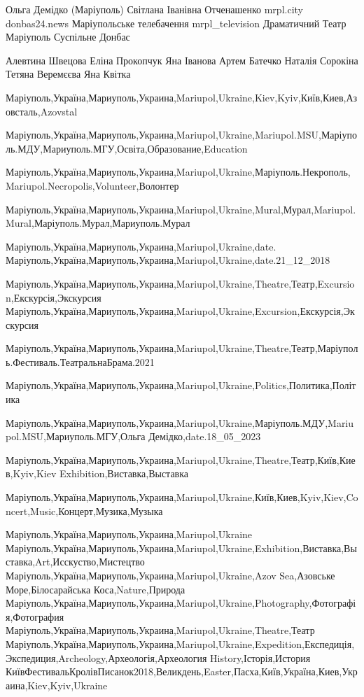  
 
 
 
 

Ольга Демідко (Маріуполь)
Світлана Іванівна Отченашенко
mrpl.city
donbas24.news
Маріупольське телебачення mrpl_television
Драматичний Театр Маріуполь
Суспільне Донбас

Алевтина Швецова
Еліна Прокопчук
Яна Іванова
Артем Батечко
Наталія Сорокіна
Тетяна Веремєєва
Яна Квітка

Маріуполь,Україна,Мариуполь,Украина,Mariupol,Ukraine,Kiev,Kyiv,Київ,Киев,Азовсталь,Azovstal

Маріуполь,Україна,Мариуполь,Украина,Mariupol,Ukraine,Mariupol.MSU,Маріуполь.МДУ,Мариуполь.МГУ,Освіта,Образование,Education

Маріуполь,Україна,Мариуполь,Украина,Mariupol,Ukraine,Маріуполь.Некрополь,Mariupol.Necropolis,Volunteer,Волонтер

Маріуполь,Україна,Мариуполь,Украина,Mariupol,Ukraine,Mural,Мурал,Mariupol.Mural,Маріуполь.Мурал,Мариуполь.Мурал

Маріуполь,Україна,Мариуполь,Украина,Mariupol,Ukraine,date.
Маріуполь,Україна,Мариуполь,Украина,Mariupol,Ukraine,date.21_12_2018

Маріуполь,Україна,Мариуполь,Украина,Mariupol,Ukraine,Theatre,Театр,Excursion,Екскурсія,Экскурсия
Маріуполь,Україна,Мариуполь,Украина,Mariupol,Ukraine,Excursion,Екскурсія,Экскурсия

Маріуполь,Україна,Мариуполь,Украина,Mariupol,Ukraine,Theatre,Театр,Маріуполь.Фестиваль.ТеатральнаБрама.2021

Маріуполь,Україна,Мариуполь,Украина,Mariupol,Ukraine,Politics,Политика,Політика

Маріуполь,Україна,Мариуполь,Украина,Mariupol,Ukraine,Маріуполь.МДУ,Mariupol.MSU,Мариуполь.МГУ,Ольга Демідко,date.18_05_2023

Маріуполь,Україна,Мариуполь,Украина,Mariupol,Ukraine,Theatre,Театр,Київ,Киев,Kyiv,Kiev
Exhibition,Виставка,Выставка

Маріуполь,Україна,Мариуполь,Украина,Mariupol,Ukraine,Київ,Киев,Kyiv,Kiev,Concert,Music,Концерт,Музика,Музыка

Маріуполь,Україна,Мариуполь,Украина,Mariupol,Ukraine
Маріуполь,Україна,Мариуполь,Украина,Mariupol,Ukraine,Exhibition,Виставка,Выставка,Art,Исскуство,Мистецтво
Маріуполь,Україна,Мариуполь,Украина,Mariupol,Ukraine,Azov Sea,Азовське Море,Білосарайська Коса,Nature,Природа
Маріуполь,Україна,Мариуполь,Украина,Mariupol,Ukraine,Photography,Фотографія,Фотография
Маріуполь,Україна,Мариуполь,Украина,Mariupol,Ukraine,Theatre,Театр
Маріуполь,Україна,Мариуполь,Украина,Mariupol,Ukraine,Expedition,Експедиція,Экспедиция,Archeology,Археологія,Археология
History,Історія,История
КиївФестивальКролівПисанок2018,Великдень,Easter,Пасха,Київ,Україна,Киев,Украина,Kiev,Kyiv,Ukraine

